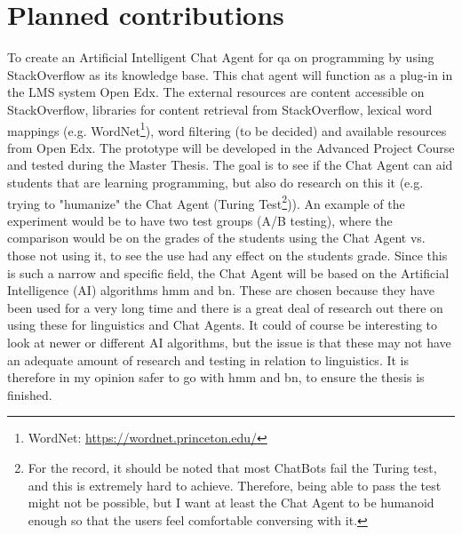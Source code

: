\section{Planned contributions}
\label{chapter2:planned_contribution}
To create an Artificial Intelligent Chat Agent for \gls{qa} on programming by using StackOverflow as its knowledge base. This chat agent will function as a plug-in in the LMS system 
Open Edx. The external resources are content accessible on StackOverflow, libraries for content retrieval from StackOverflow, lexical word mappings (e.g. WordNet\footnote{WordNet: 
\url{https://wordnet.princeton.edu/}}), word filtering (to be decided) and available resources from Open Edx.
\vspace{0.5em}\newline
The prototype will be developed in the Advanced Project Course and tested during the Master Thesis. The goal is to see if the Chat Agent can aid students that are learning programming, 
but also do research on this it (e.g. trying to "humanize" the Chat Agent (Turing Test\footnote{For the record, it should be noted that most ChatBots fail the Turing test, and this 
is extremely hard to achieve. Therefore, being able to pass the test might not be possible, but I want at least the Chat Agent to be humanoid enough so that the users feel comfortable 
conversing with it.})). An example of the experiment would be to have two test groups (A/B testing), where the comparison would be on the grades of the students using the Chat Agent 
vs. those not using it, to see the use had any effect on the students grade.
\vspace{0.5em}\newline
Since this is such a narrow and specific field, the Chat Agent will be based on the Artificial Intelligence (AI) algorithms  \gls{hmm} and 
\gls{bn}. These are chosen because they have been used for a very long time and there is a great deal of research out there on using these for linguistics and Chat Agents. It could 
of course be interesting to look at newer or different AI algorithms, but the issue is that these may not have an adequate amount of research and testing in relation to linguistics. 
It is therefore in my opinion safer to go with \gls{hmm} and  \gls{bn}, to ensure the thesis is finished.